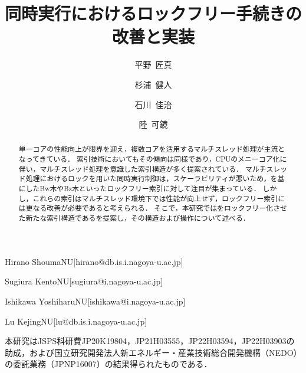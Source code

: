 \documentclass[
  submit,
  techrep,
  noauthor,
  a4paper,
  notitlepage,
  ja=standard,
  autodetect-engine,
  dvi=dvipdfmx
]{ipsj}
\begin{document}
\title{同時実行\Bptree{}におけるロックフリー手続きの改善と実装}


\author{平野~匠真}{Hirano Shouma}{NU}[hirano@db.is.i.nagoya-u.ac.jp]
\author{杉浦~健人}{Sugiura Kento}{NU}[sugiura@i.nagoya-u.ac.jp]
\author{石川~佳治}{Ishikawa Yoshiharu}{NU}[ishikawa@i.nagoya-u.ac.jp]
\author{陸~可鏡}{Lu Kejing}{NU}[lu@db.is.i.nagoya-u.ac.jp]

\begin{abstract}
  単一コアの性能向上が限界を迎え，複数コアを活用するマルチスレッド処理が主流となってきている．
  索引技術においてもその傾向は同様であり，CPUのメニーコア化に伴い，マルチスレッド処理を意識した索引構造が多く提案されている．
  マルチスレッド処理におけるロックを用いた同時実行制御は，スケーラビリティが悪いため，\Bptree{}を基にしたBw木やBz木といったロックフリー索引に対して注目が集まっている．
  しかし，これらの索引はマルチスレッド環境下では性能が向上せず，ロックフリー索引には更なる改善が必要であると考えられる．
  そこで，本研究では\Bptree{}をロックフリー化させた新たな索引構造である\Bctree{}を提案し，その構造および操作について述べる．
\end{abstract}

\maketitle



\begin{acknowledgment}
  本研究はJSPS科研費JP20K19804，JP21H03555，JP22H03594，JP22H03903の助成，および国立研究開発法人新エネルギー・産業技術総合開発機構（NEDO）の委託業務（JPNP16007）の結果得られたものである．
\end{acknowledgment}



\end{document}
